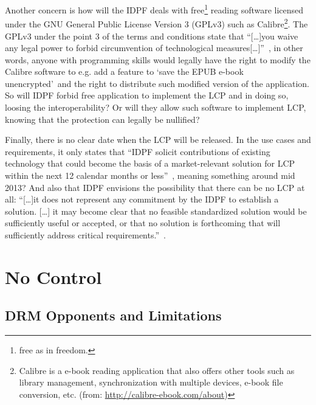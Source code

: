 \documentclass[11pt,a4paper,oneside]{memoir}
\begin{document}
Another concern is how will the IDPF deals with free\footnote{free as in freedom.} reading software licensed under the GNU General Public License Version 3 (GPLv3) such as Calibre\footnote{Calibre is a e-book reading application that also offers other tools such as library management, synchronization with multiple devices, e-book file conversion, etc. (from: \url{http://calibre-ebook.com/about})}. The GPLv3 under the point 3 of the terms and conditions state that \textquotedblleft [\ldots]you waive any legal power to forbid circumvention of technological measures[\ldots]\textquotedblright ~\cite{fsf:gplv3}, in other words, anyone with programming skills would legally have the right to modify the Calibre software to e.g. add a feature to \textquoteleft save the EPUB e-book unencrypted\textquoteright ~and the right to distribute such modified version of the application. So will IDPF forbid free application to implement the LCP and in doing so, loosing the interoperability? Or will they allow such software to implement LCP, knowing that the protection can legally be nullified?

Finally, there is no clear date when the LCP will be released. In the use cases and requirements, it only states that \textquotedblleft IDPF solicit contributions of existing technology that could become the basis of a market-relevant solution for LCP within the next 12 calendar months or less\textquotedblright ~\cite[Why Consider LCP for EPUB? section]{idpf:lcp-uc}, meaning something around mid 2013? And also that IDPF envisions the possibility that there can be no LCP at all: \textquotedblleft [\ldots]it does not represent any commitment by the IDPF to establish a solution. [\ldots] it may become clear that no feasible standardized solution would be sufficiently useful or accepted, or that no solution is forthcoming that will sufficiently address critical requirements.\textquotedblright ~\cite{idpf:drm-rfc}.

\chapter{No Control}

\section{DRM Opponents and Limitations}\label{def:opp}
\end{document}
